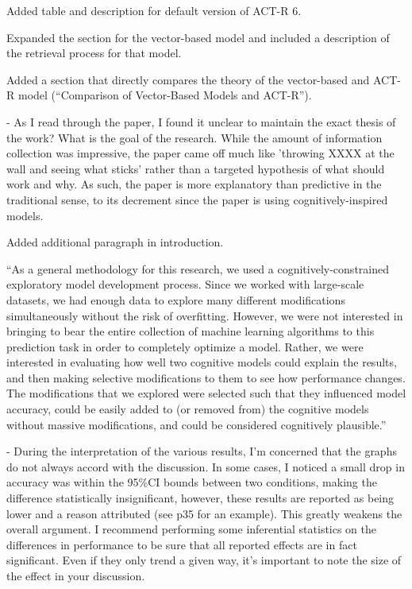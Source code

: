 \documentclass[answers,12pt]{exam}
\begin{document}
\begin{questions}
\begin{solution}
Added table and description for default version of ACT-R 6.

Expanded the section for the vector-based model and included a description of the retrieval process for that model.

Added a section that directly compares the theory of the vector-based and ACT-R model (``Comparison of Vector-Based Models and ACT-R'').
\end{solution}

\question - As I read through the paper, I found it unclear to maintain the exact thesis of the work? What is the goal of the research. While the amount of information collection was impressive, the paper came off much like 'throwing XXXX at the wall and seeing what sticks' rather than a targeted hypothesis of what should work and why. As such, the paper is more explanatory than predictive in the traditional sense, to its decrement since the paper is using cognitively-inspired models.

\begin{solution}
Added additional paragraph in introduction.

``As a general methodology for this research, we used a cognitively-constrained
exploratory model development process. Since we worked with large-scale datasets, we had enough data to explore many different modifications simultaneously without the risk of overfitting. However, we were not interested in bringing to bear the entire collection of machine learning algorithms to this prediction task in order to completely optimize a model. Rather, we were interested in evaluating how well two cognitive models could explain the results, and then making selective modifications to them to see how performance changes. The modifications that we explored were selected such that they influenced model accuracy, could be easily added to (or removed from) the cognitive models without massive modifications, and could be considered cognitively plausible.''
\end{solution}

\question - During the interpretation of the various results, I'm concerned that the graphs do not always accord with the discussion. In some cases, I noticed a small drop in accuracy was within the 95\%CI bounds between two conditions, making the difference statistically insignificant, however, these results are reported as being lower and a reason attributed (see p35 for an example). This greatly weakens the overall argument. I recommend performing some inferential statistics on the differences in performance to be sure that all reported effects are in fact significant. Even if they only trend a given way, it's important to note the size of the effect in your discussion.


\end{questions}
\end{document}
